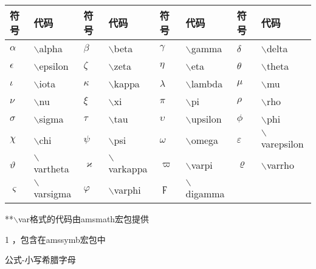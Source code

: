 \documentclass[UTF8,fontset=ubuntu]{ctexbook}
\begin{document}
\begin{threeparttable}
\begin{tabular}{l l l l l l l l}
	\hline
	符号 & 代码 & 符号 & 代码 & 符号 & 代码 & 符号 & 代码\\
	\hline
	$\alpha$ & $\backslash$alpha & $\beta$ & $\backslash$beta & $\gamma$ & $\backslash$gamma & $\delta$ & $\backslash$delta\\
	$\epsilon$ & $\backslash$epsilon & $\zeta$ & $\backslash$zeta & $\eta$ & $\backslash$eta & $\theta$ & $\backslash$theta\\
	$\iota$ & $\backslash$iota & $\kappa$ & $\backslash$kappa & $\lambda$ & $\backslash$lambda & $\mu$ & $\backslash$mu\\
	$\nu$ & $\backslash$nu & $\xi$ & $\backslash$xi & $\pi$ & $\backslash$pi & $\rho$ & $\backslash$rho\\
	$\sigma$ & $\backslash$sigma & $\tau$ & $\backslash$tau & $\upsilon$ & $\backslash$upsilon & $\phi$ & $\backslash$phi\\
	$\chi$ & $\backslash$chi & $\psi$ & $\backslash$psi & $\omega$ & $\backslash$omega & $\varepsilon$ & $\backslash$varepsilon\\
	$\vartheta$ & $\backslash$vartheta & $\varkappa$ & $\backslash$varkappa\tnote{1} & $\varpi$ & $\backslash$varpi & $\varrho$ & $\backslash$varrho\tnote{1}\\
	$\varsigma$ & $\backslash$varsigma & $\varphi$ & $\backslash$varphi & $\digamma$ & $\backslash$digamma\tnote{1}\\
	\hline
\end{tabular}
**$\backslash$var格式的代码由amsmath宏包提供
\begin{tablenotes}
	\item[1] ，包含在amssymb宏包中
\end{tablenotes}
\caption{公式-小写希腊字母}
\end{threeparttable}
\end{document}
